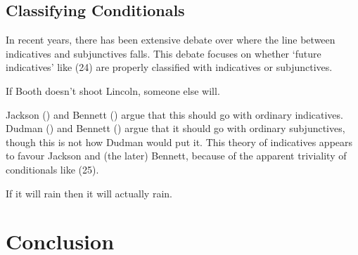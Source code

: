 \documentclass[
  10pt,
  letterpaper,
  DIV=11,
  numbers=noendperiod,
  twoside]{scrartcl}
\providecommand{\tightlist}{%
  \setlength{\itemsep}{0pt}\setlength{\parskip}{0pt}}\usepackage{longtable,booktabs,array}
\begin{document}
\subsection{Classifying Conditionals}\label{classifying-conditionals}

In recent years, there has been extensive debate over where the line
between indicatives and subjunctives falls. This debate focuses on
whether `future indicatives' like (24) are properly classified with
indicatives or subjunctives.

\begin{description}
\tightlist
\item[(24)]
If Booth doesn't shoot Lincoln, someone else will.
\end{description}

Jackson () and Bennett
() argue that this should go with
ordinary indicatives. Dudman () and
Bennett () argue that it should go with
ordinary subjunctives, though this is not how Dudman would put it. This
theory of indicatives appears to favour Jackson and (the later) Bennett,
because of the apparent triviality of conditionals like (25).

\begin{description}
\tightlist
\item[(25)]
If it will rain then it will actually rain.
\end{description}

\section{Conclusion}\label{conclusion}
\end{document}
